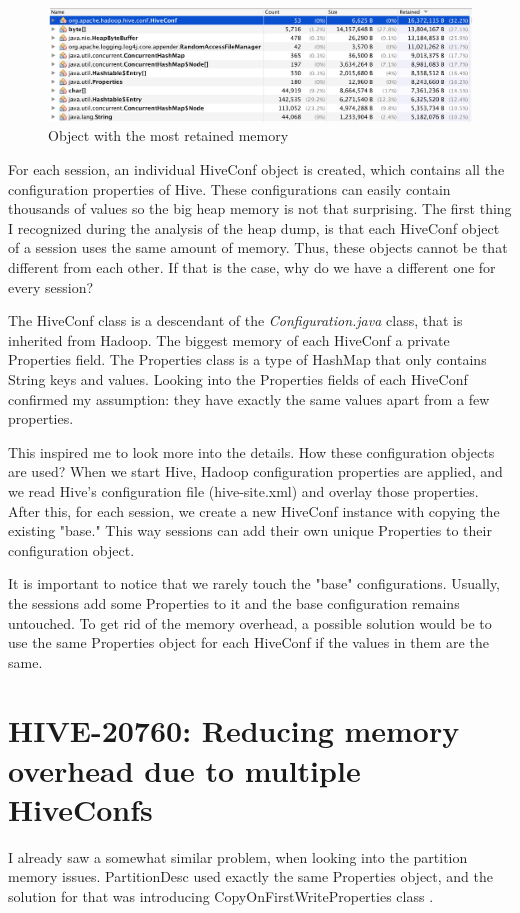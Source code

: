 \begin{figure}[H]
	\includegraphics[width=150mm, keepaspectratio]{figures/hiveconf_memory.png}
	\centering
	\caption{Object with the most retained memory}
\end{figure}

For each session, an individual HiveConf object is created, which contains all the configuration properties of Hive. These configurations can easily contain thousands of values so the big heap memory is not that surprising. The first thing I recognized during the analysis of the heap dump, is that each HiveConf object of a session uses the same amount of memory. Thus, these objects cannot be that different from each other. If that is the case, why do we have a different one for every session?

The HiveConf class is a descendant of the \textit{Configuration.java} class, that is inherited from Hadoop. The biggest memory of each HiveConf a private Properties field. The Properties class is a type of HashMap that only contains String keys and values. Looking into the Properties fields of each HiveConf confirmed my assumption: they have exactly the same values apart from a few properties.

This inspired me to look more into the details. How these configuration objects are used? When we start Hive, Hadoop configuration properties are applied, and we read Hive's configuration file (hive-site.xml) and overlay those properties. After this, for each session, we create a new HiveConf instance with copying the existing "base." This way sessions can add their own unique Properties to their configuration object. 

It is important to notice that we rarely touch the "base" configurations. Usually, the sessions add some Properties to it and the base configuration remains untouched. To get rid of the memory overhead, a possible solution would be to use the same Properties object for each HiveConf if the values in them are the same.

\section{HIVE-20760: Reducing memory overhead due to multiple HiveConfs}
I already saw a somewhat similar problem, when looking into the partition memory issues. PartitionDesc used exactly the same Properties object, and the solution for that was introducing CopyOnFirstWriteProperties class \cite{hive-partitions}. 

